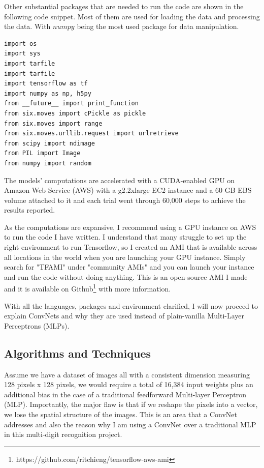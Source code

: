 \documentclass[twoside, column]{article}
\begin{document}
Other substantial packages that are needed to run the code are shown in the following code snippet. Most of them are used for loading the data and processing the data. With $numpy$ being the most used package for data manipulation.

\begin{verbatim}
import os
import sys
import tarfile
import tarfile
import tensorflow as tf
import numpy as np, h5py 
from __future__ import print_function
from six.moves import cPickle as pickle
from six.moves import range
from six.moves.urllib.request import urlretrieve
from scipy import ndimage
from PIL import Image
from numpy import random
 \end{verbatim}

The models' computations are accelerated with a CUDA-enabled GPU on Amazon Web Service (AWS) with a g2.2xlarge EC2 instance and a 60 GB EBS volume attached to it and each trial went through 60,000 steps to achieve the results reported. 

As the computations are expansive, I recommend using a GPU instance on AWS to run the code I have written. I understand that many struggle to set up the right environment to run Tensorflow, so I created an AMI that is available across all locations in the world when you are launching your GPU instance. Simply search for "TFAMI" under "community AMIs" and you can launch your instance and run the code without doing anything. This is an open-source AMI I made and it is available on Github\footnote{https://github.com/ritchieng/tensorflow-aws-ami} with more information.

With all the languages, packages and environment clarified, I will now proceed to explain ConvNets and why they are used instead of plain-vanilla Multi-Layer Perceptrons (MLPs). 

\subsection{Algorithms and Techniques}


Assume we have a dataset of images all with a consistent dimension measuring 128 pixels x 128 pixels, we would require a total of 16,384 input weights plus an additional bias in the case of a traditional feedforward Multi-layer Perceptron (MLP). Importantly, the major flaw is that if we reshape the pixels into a vector, we lose the spatial structure of the images. This is an area that a ConvNet addresses and also the reason why I am using a ConvNet over a traditional MLP in this multi-digit recognition project.
\end{document}
